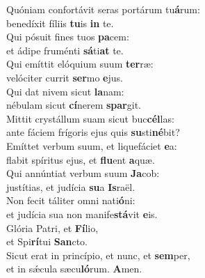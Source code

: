 \evenverse Quóniam confortávit seras portárum tu\textbf{á}rum:~\*\\
\evenverse benedíxit fíliis \textbf{tu}is \textbf{in} te.\\
\oddverse Qui pósuit fines tuos \textbf{pa}cem:~\*\\
\oddverse et ádipe fruménti \textbf{sá}ti\textbf{at} te.\\
\evenverse Qui emíttit elóquium suum \textbf{ter}ræ:~\*\\
\evenverse velóciter currit \textbf{ser}mo \textbf{e}jus.\\
\oddverse Qui dat nivem sicut \textbf{la}nam:~\*\\
\oddverse nébulam sicut \textbf{cí}nerem \textbf{spar}git.\\
\evenverse Mittit crystállum suam sicut buc\textbf{cél}las:~\*\\
\evenverse ante fáciem frígoris ejus quis \textbf{su}sti\textbf{né}bit?\\
\oddverse Emíttet verbum suum, et liquefáciet \textbf{e}a:~\*\\
\oddverse flabit spíritus ejus, et \textbf{flu}ent \textbf{a}quæ.\\
\evenverse Qui annúntiat verbum suum \textbf{Ja}cob:~\*\\
\evenverse justítias, et judícia \textbf{su}a \textbf{Is}raël.\\
\oddverse Non fecit táliter omni nati\textbf{ó}ni:~\*\\
\oddverse et judícia sua non manife\textbf{stá}vit \textbf{e}is.\\
\evenverse Glória Patri, et \textbf{Fí}lio,~\*\\
\evenverse et Spi\textbf{rí}tui \textbf{San}cto.\\
\oddverse Sicut erat in princípio, et nunc, et \textbf{sem}per,~\*\\
\oddverse et in sǽcula sæcu\textbf{ló}rum. \textbf{A}men.\\

